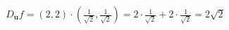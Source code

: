 \documentclass[preview]{standalone}
\begin{document}
\begin{align*}
D_{\mathbf{u}} f = (2, 2) \cdot \left( \frac{1}{\sqrt{2}}, \frac{1}{\sqrt{2}} \right) = 2 \cdot \frac{1}{\sqrt{2}} + 2 \cdot \frac{1}{\sqrt{2}} = 2\sqrt{2}
\end{align*}
\end{document}
